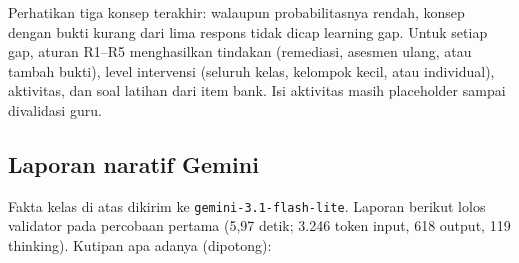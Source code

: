 \documentclass[11pt,a4paper]{article}
\begin{document}
Perhatikan tiga konsep terakhir: walaupun probabilitasnya rendah, konsep dengan bukti kurang dari lima respons tidak
dicap learning gap. Untuk setiap gap, aturan R1--R5 menghasilkan tindakan (remediasi, asesmen ulang, atau tambah
bukti), level intervensi (seluruh kelas, kelompok kecil, atau individual), aktivitas, dan soal latihan dari item bank.
Isi aktivitas masih placeholder sampai divalidasi guru.

\subsection{Laporan naratif Gemini}

Fakta kelas di atas dikirim ke \texttt{gemini-3.1-flash-lite}. Laporan berikut lolos validator pada percobaan pertama
(5,97 detik; 3.246 token input, 618 output, 119 thinking). Kutipan apa adanya (dipotong):
\end{document}
